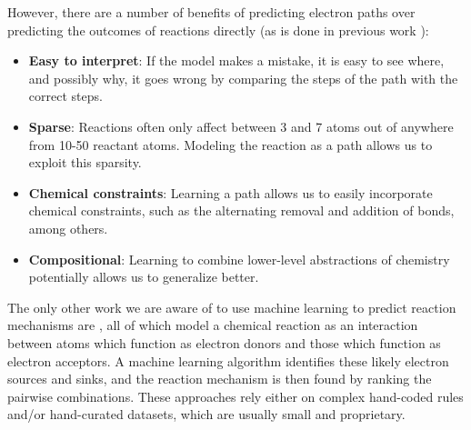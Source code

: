 However, there are a number of benefits of predicting electron paths over predicting the outcomes of reactions directly (as is done in previous work \cite{jin2017predicting,schwaller2017found}):
\begin{itemize}
\item \textbf{Easy to interpret}: If the model makes a mistake, it is easy to see where, and possibly why, it goes wrong by comparing the steps of the path with the correct steps.
\item \textbf{Sparse}: Reactions often only affect between 3 and 7 atoms out of anywhere from 10-50 reactant atoms. Modeling the reaction as a path allows us to exploit this sparsity.
\item \textbf{Chemical constraints}: Learning a path allows us to easily incorporate chemical constraints, such as the alternating removal and addition of bonds, among others. 
\item \textbf{Compositional}: Learning to combine lower-level abstractions of chemistry potentially allows us to generalize better.
\end{itemize}
The only other work we are aware of to use machine learning to predict reaction mechanisms are \cite{fooshee2018deep,kayala2012reactionpredictor,kayala2011learning},
all of which model a chemical reaction as an interaction between atoms which function as electron donors
and those which function as electron acceptors.
A machine learning algorithm identifies these likely electron sources and sinks, 
and the reaction mechanism is then found by ranking the pairwise combinations.
These approaches rely either on complex hand-coded rules and/or hand-curated datasets, 
which are usually small and proprietary.
